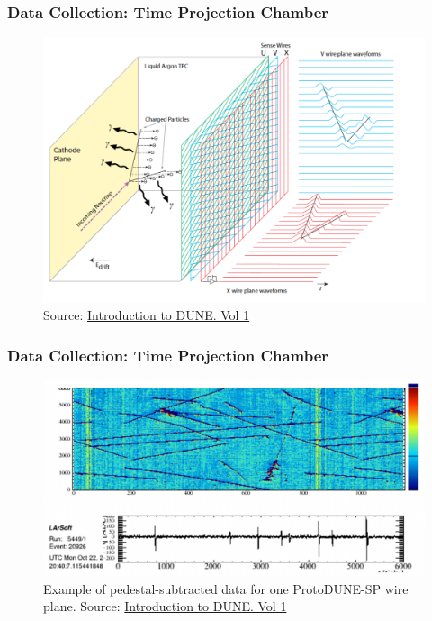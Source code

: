 \documentclass{beamer}
\begin{document}
\begin{frame}
	\frametitle{Data Collection: Time Projection Chamber}
	\begin{figure}[h!]
		\includegraphics[width=.7\textwidth]{images/LArTPC.png}
		\caption{Source: \href{https://arxiv.org/abs/2002.02967}{\color{blue} Introduction to DUNE. Vol 1}}
		\label{far_detector}
	\end{figure}
\end{frame}

\begin{frame}
	\frametitle{Data Collection: Time Projection Chamber}
	\begin{figure}[h!]
		\includegraphics[width=.8\textwidth]{images/data1.png}
		\caption{Example of pedestal-subtracted data for one ProtoDUNE-SP wire plane. Source: \href{https://arxiv.org/abs/2002.02967}{\color{blue} Introduction to DUNE. Vol 1}}
		\label{far_detector}
	\end{figure}
\end{frame}
\end{document}
